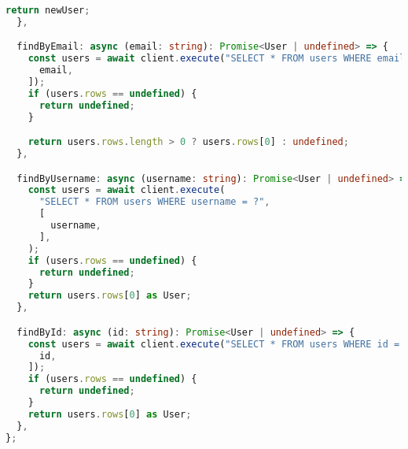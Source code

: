 \begin{lstlisting}[language=TypeScript]
    return newUser;
  },

  findByEmail: async (email: string): Promise<User | undefined> => {
    const users = await client.execute("SELECT * FROM users WHERE email = ?", [
      email,
    ]);
    if (users.rows == undefined) {
      return undefined;
    }

    return users.rows.length > 0 ? users.rows[0] : undefined;
  },

  findByUsername: async (username: string): Promise<User | undefined> => {
    const users = await client.execute(
      "SELECT * FROM users WHERE username = ?",
      [
        username,
      ],
    );
    if (users.rows == undefined) {
      return undefined;
    }
    return users.rows[0] as User;
  },

  findById: async (id: string): Promise<User | undefined> => {
    const users = await client.execute("SELECT * FROM users WHERE id = ?", [
      id,
    ]);
    if (users.rows == undefined) {
      return undefined;
    }
    return users.rows[0] as User;
  },
};
\end{lstlisting}

